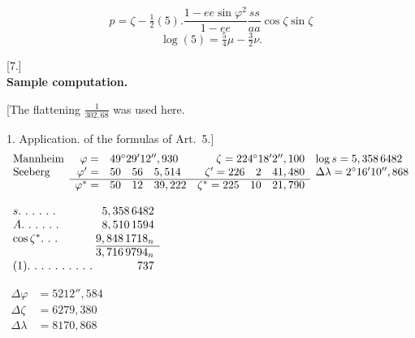 \clearpage
\noindent\makebox[12mm][l]{}\par\medskip
{}
\[
p=\zeta-\tfrac12(5).\frac{1-ee\sin\varphi^2}{1-ee}\frac{ss}{aa}\cos\zeta\sin\zeta
\]
\[\log(5)=\tfrac54\mu-\tfrac32\nu.\]
\begin{center}[7.]\\[.5ex]\textbf{Sample computation.}\end{center}

[The flattening \(\frac1{302,68}\) was used here.

1. Application. of the formulas of Art.~5.]
\begingroup\small
\[
\begin{array}{lrlrl}
\text{Mannheim}&\varphi=&49^\circ29'12'',930&\zeta=224^\circ18'2'',100&\log s=5,358\,6482\\
\text{Seeberg}&\varphi'=&50\quad56\quad5,514&\zeta'=226\quad2\quad41,480&\Delta\lambda=2^\circ16'10'',868\\\cline{2-4}
&\varphi^*=&50\quad12\quad39,222&\zeta^*=225\quad10\quad21,790&
\end{array}
\]
\noindent\begin{minipage}[t]{.28\linewidth}\vspace{0pt}\centering
\(\begin{array}{l@{\;}r}
s\ldotp\,\ldotp\,\ldotp\,\ldotp\,\ldotp\,\ldotp&5,358\,6482\\
A\ldotp\,\ldotp\,\ldotp\,\ldotp\,\ldotp\,\ldotp&8,510\,1594\\
\cos\zeta^*\ldotp\,\ldotp\,\ldotp&9,848\,1718_n\\\cline{2-2}
&3,716\,9794_n\\
(1)\ldotp\,\ldotp\,\ldotp\,\ldotp\,\ldotp\,\ldotp\,\ldotp\,\ldotp\,\ldotp\,\ldotp&737
\end{array}\)
\par\vspace{3.7ex}
\(\begin{aligned}
\Delta\varphi&=5212'',584\\
\Delta\zeta&=6279,380\\
\Delta\lambda&=8170,868
\end{aligned}\)
\end{minipage}\hfill
